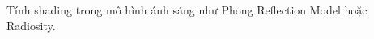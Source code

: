 \documentclass[preview]{standalone}
\begin{document}
\begin{center}
Tính shading trong mô hình ánh sáng như Phong Reflection Model hoặc Radiosity.
\end{center}
\end{document}
